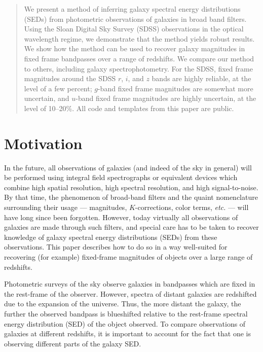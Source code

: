 \documentclass[10pt,preprint]{aastex}
\begin{document}
\begin{abstract}
We present a method of inferring galaxy spectral energy distributions
(SEDs) from photometric observations of galaxies in broad band
filters. Using the Sloan Digital Sky Survey (SDSS) observations in the
optical wavelength regime, we demonstrate that the method yields
robust results. We show how the method can be used to recover galaxy
magnitudes in fixed frame bandpasses over a range of redshifts. We
compare our method to others, including galaxy spectrophotometry. For
the SDSS, fixed frame magnitudes around the SDSS $r$, $i$, and $z$
bands are highly reliable, at the level of a few percent; $g$-band
fixed frame magnitudes are somewhat more uncertain, and $u$-band fixed
frame magnitudes are highly uncertain, at the level of 10--20\%. All
code and templates from this paper are public.
\end{abstract}


%
%

\section{Motivation}
\label{motivation}

In the future, all observations of galaxies (and indeed of the sky in
general) will be performed using integral field spectrographs or
equivalent devices which combine high spatial resolution, high
spectral resolution, and high signal-to-noise. By that time, the
phenomenon of broad-band filters and the quaint nomenclature
surrounding their usage --- magnitudes, $K$-corrections, color terms,
{\it etc.} --- will have long since been forgotten. However, today
virtually all observations of galaxies are made through such filters,
and special care has to be taken to recover knowledge of galaxy
spectral energy distributions (SEDs) from these observations. This
paper describes how to do so in a way well-suited for recovering (for
example) fixed-frame magnitudes of objects over a large range of
redshifts.

Photometric surveys of the sky observe galaxies in bandpasses which
are fixed in the rest-frame of the observer. However, spectra of
distant galaxies are redshifted due to the expansion of the
universe. Thus, the more distant the galaxy, the further the observed
bandpass is blueshifted relative to the rest-frame spectral energy
distribution (SED) of the object observed. To compare observations of
galaxies at different redshifts, it is important to account for the
fact that one is observing different parts of the galaxy SED.
\end{document}
